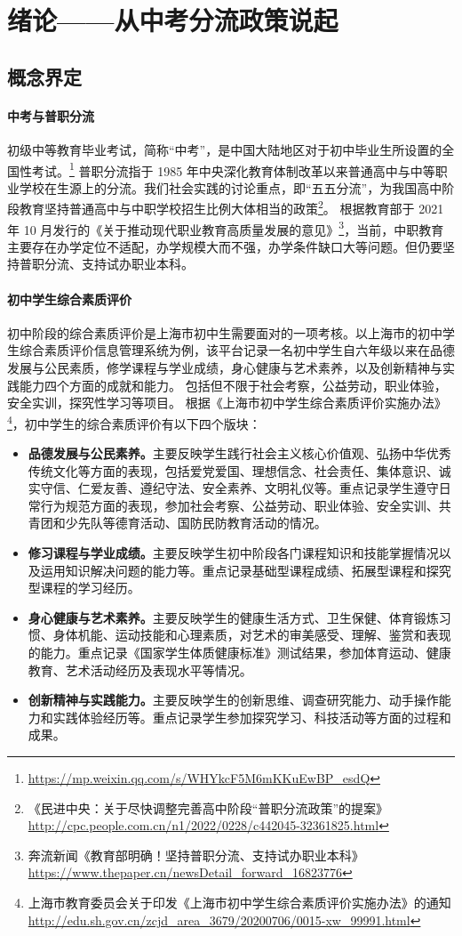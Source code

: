 \documentclass[12pt,UTF8]{ctexart}
\begin{document}
\section {绪论——从中考分流政策说起}
\subsection {概念界定}
\paragraph {中考与普职分流}
初级中等教育毕业考试，简称“中考”，是中国大陆地区对于初中毕业生所设置的全国性考试。\footnote{\url{https://mp.weixin.qq.com/s/WHYkcF5M6mKKuEwBP_esdQ}}
普职分流指于 1985
年中央深化教育体制改革以来普通高中与中等职业学校在生源上的分流。我们社会实践的讨论重点，即“五五分流”，为我国高中阶段教育坚持普通高中与中职学校招生比例大体相当的政策\footnote{《民进中央：关于尽快调整完善高中阶段“普职分流政策”的提案》
	\url{http://cpc.people.com.cn/n1/2022/0228/c442045-32361825.html}}。 
根据教育部于 2021 年 10 月发行的《关于推动现代职业教育高质量发展的意见》\footnote{奔流新闻《教育部明确！坚持普职分流、支持试办职业本科》
	\url{https://www.thepaper.cn/newsDetail_forward_16823776}}，当前，中职教育主要存在办学定位不适配，办学规模大而不强，办学条件缺口大等问题。但仍要坚持普职分流、支持试办职业本科。

\paragraph {初中学生综合素质评价}
初中阶段的综合素质评价是上海市初中生需要面对的一项考核。以上海市的初中学生综合素质评价信息管理系统为例，该平台记录一名初中学生自六年级以来在品德发展与公民素质，修学课程与学业成绩，身心健康与艺术素养，以及创新精神与实践能力四个方面的成就和能力。
包括但不限于社会考察，公益劳动，职业体验，安全实训，探究性学习等项目。
根据《上海市初中学生综合素质评价实施办法》\footnote{上海市教育委员会关于印发《上海市初中学生综合素质评价实施办法》的通知
	\url{http://edu.sh.gov.cn/zcjd_area_3679/20200706/0015-xw_99991.html}}，初中学生的综合素质评价有以下四个版块：
\begin {itemize}
\item [1)]
\textbf{品德发展与公民素养。}主要反映学生践行社会主义核心价值观、弘扬中华优秀传统文化等方面的表现，包括爱党爱国、理想信念、社会责任、集体意识、诚实守信、仁爱友善、遵纪守法、安全素养、文明礼仪等。重点记录学生遵守日常行为规范方面的表现，参加社会考察、公益劳动、职业体验、安全实训、共青团和少先队等德育活动、国防民防教育活动的情况。
\item [2)]
\textbf{修习课程与学业成绩。}主要反映学生初中阶段各门课程知识和技能掌握情况以及运用知识解决问题的能力等。重点记录基础型课程成绩、拓展型课程和探究型课程的学习经历。
\item [3)]
\textbf{身心健康与艺术素养。}主要反映学生的健康生活方式、卫生保健、体育锻炼习惯、身体机能、运动技能和心理素质，对艺术的审美感受、理解、鉴赏和表现的能力。重点记录《国家学生体质健康标准》测试结果，参加体育运动、健康教育、艺术活动经历及表现水平等情况。
\item [4)]
\textbf{创新精神与实践能力。}主要反映学生的创新思维、调查研究能力、动手操作能力和实践体验经历等。重点记录学生参加探究学习、科技活动等方面的过程和成果。
\end {itemize}
\end{document}
